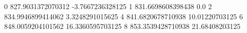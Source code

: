 0 827.9031372070312 -3.7667236328125
1 831.6698608398438 0.0
2 834.9946899414062 3.3248291015625
4 841.6820678710938 10.01220703125
6 848.0059204101562 16.3360595703125
8 853.3539428710938 21.68408203125
